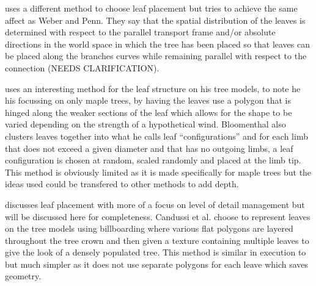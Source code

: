 \documentclass[review]{cmpreport}
\begin{document}
\cite{runions2007colonization} uses a different method to choose leaf placement but tries 
to achieve the same affect as Weber and Penn. They say that the spatial distribution of the 
leaves is determined with respect to the parallel transport frame and/or absolute directions 
in the world space in which the tree has been placed so that leaves can be placed along the 
branches curves while remaining parallel with respect to the connection (NEEDS CLARIFICATION). 
\par
\cite{bloomenthal1985modeling} uses an interesting method for the leaf structure on his tree 
models, to note he his focussing on only maple trees, by having the leaves use a polygon that 
is hinged along the weaker sections of the leaf which allows for the shape to be varied 
depending on the strength of a hypothetical wind. Bloomenthal also clusters leaves together 
into what he calls leaf ``configurations'' and for each limb that does not exceed a given 
diameter and that has no outgoing limbs, a leaf configuration is chosen at random, scaled 
randomly and placed at the limb tip. This method is obviously limited as it is made specifically 
for maple trees but the ideas used could be transfered to other methods to add depth.\par
\cite{candussi2005rendering} discusses leaf placement with more of a focus on level of detail 
management but will be discussed here for completeness. Candussi et al. choose to represent 
leaves on the tree models using billboarding where various flat polygons are layered throughout 
the tree crown and then given a texture containing multiple leaves to give the look of a 
densely populated tree. This method is similar in execution to \cite{bloomenthal1985modeling} 
but much simpler as it does not use separate polygons for each leave which saves geometry.
\end{document}
